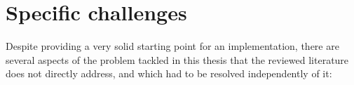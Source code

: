 %

\section{Specific challenges}
Despite providing a very solid starting point for an implementation, there are several aspects
of the problem tackled in this thesis that the reviewed literature does not directly address,
and which had to be resolved independently of it:

